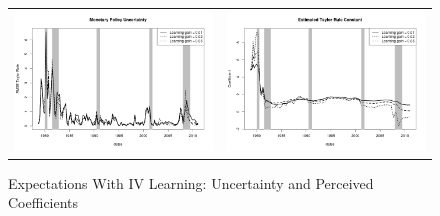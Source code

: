\documentclass[12pt]{article}
\begin{document}
\begin{figure}\caption{Expectations With IV Learning: Uncertainty and Perceived Coefficients}\label{fg:coefs_iv}\vspace*{1pc}
\hspace*{-0.6in}\begin{tabular}{cc}
\includegraphics[scale=0.4]{mpu_iv.png} & \includegraphics[scale=0.4]{coef_constant_iv.png} \\ [1pc]

\end{tabular}
\end{figure}
\end{document}
